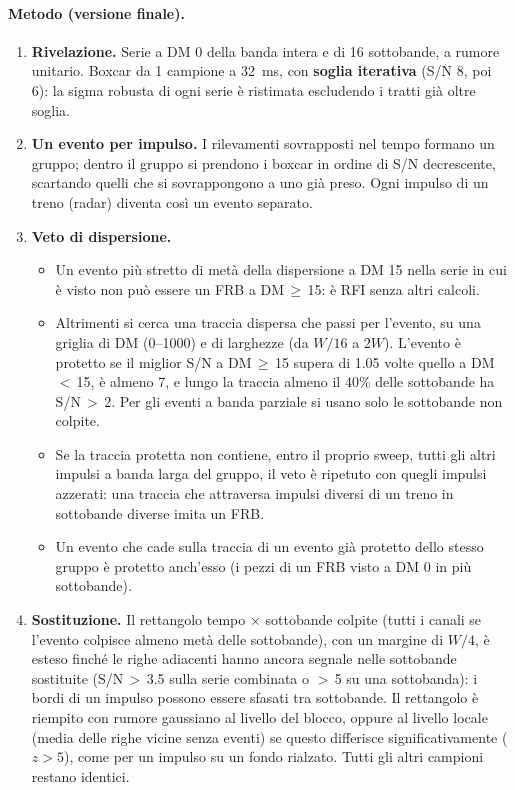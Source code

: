 \paragraph{Metodo (versione finale).}
\begin{enumerate}
  \item \textbf{Rivelazione.} Serie a DM 0 della banda intera e di 16 sottobande, a rumore unitario. Boxcar da 1
    campione a \SI{32}{\milli\second}, con \textbf{soglia iterativa} (S/N 8, poi 6): la sigma robusta di ogni serie
    è ristimata escludendo i tratti già oltre soglia.
  \item \textbf{Un evento per impulso.} I rilevamenti sovrapposti nel tempo formano un gruppo; dentro il gruppo si
    prendono i boxcar in ordine di S/N decrescente, scartando quelli che si sovrappongono a uno già preso. Ogni impulso di
    un treno (radar) diventa così un evento separato.
  \item \textbf{Veto di dispersione.}
    \begin{itemize}
      \item Un evento più stretto di metà della dispersione a DM 15 nella serie in cui è visto non può essere un FRB a
        DM\,$\geq$\,15: è RFI senza altri calcoli.
      \item Altrimenti si cerca una traccia dispersa che passi per l'evento, su una griglia di DM (0--1000) e di larghezze
        (da $W/16$ a $2W$). L'evento è protetto se il miglior S/N a DM\,$\geq$\,15 supera di 1.05 volte quello a DM\,$<$\,15,
        è almeno 7, e lungo la traccia almeno il 40\% delle sottobande ha S/N\,$>$\,2. Per gli eventi a banda parziale si
        usano solo le sottobande non colpite.
      \item Se la traccia protetta non contiene, entro il proprio sweep, tutti gli altri impulsi a banda larga del
        gruppo, il veto è ripetuto con quegli impulsi azzerati: una traccia che attraversa impulsi diversi di un treno in
        sottobande diverse imita un FRB.
      \item Un evento che cade sulla traccia di un evento già protetto dello stesso gruppo è protetto anch'esso (i pezzi
        di un FRB visto a DM 0 in più sottobande).
    \end{itemize}
  \item \textbf{Sostituzione.} Il rettangolo tempo $\times$ sottobande colpite (tutti i canali se l'evento colpisce
    almeno metà delle sottobande), con un margine di $W/4$, è esteso finché le righe adiacenti hanno ancora segnale nelle
    sottobande sostituite (S/N\,$>$\,3.5 sulla serie combinata o $>$\,5 su una sottobanda): i bordi di un impulso possono
    essere sfasati tra sottobande. Il rettangolo è riempito con rumore gaussiano al livello del blocco, oppure al livello
    locale (media delle righe vicine senza eventi) se questo differisce significativamente ($z>5$), come per un impulso su
    un fondo rialzato. Tutti gli altri campioni restano identici.
\end{enumerate}


